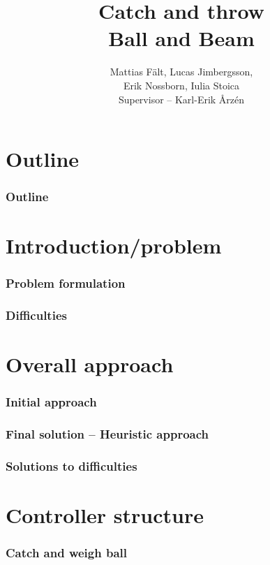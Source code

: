 \documentclass[
compress]
{beamer}
\title[Catch and Throw]{Catch and throw\\Ball and Beam}
\author[]{Mattias Fält, Lucas Jimbergsson,\\Erik Nossborn, Iulia Stoica\\\vspace{1em}Supervisor -- Karl-Erik Årz\'{e}n}
\begin{document}
\frame{\titlepage}

\section*{Outline}


\frame
{
  \frametitle{Outline}
  \tableofcontents%
}

\section{Introduction/problem}
\frame{\sectionpage}
\begin{frame}
\frametitle{Problem formulation}

\end{frame}

\begin{frame}
\frametitle{Difficulties}

\end{frame}

\section{Overall approach}
\frame{\sectionpage}
\begin{frame}
\frametitle{Initial approach}

\end{frame}

\begin{frame}
\frametitle{Final solution -- Heuristic approach}

\end{frame}

\begin{frame}
\frametitle{Solutions to difficulties}

\end{frame}

\section{Controller structure}
\frame{\sectionpage}
\begin{frame}
\end{frame}

\begin{frame}
\frametitle{Catch and weigh ball}

\end{frame}
\end{document}
